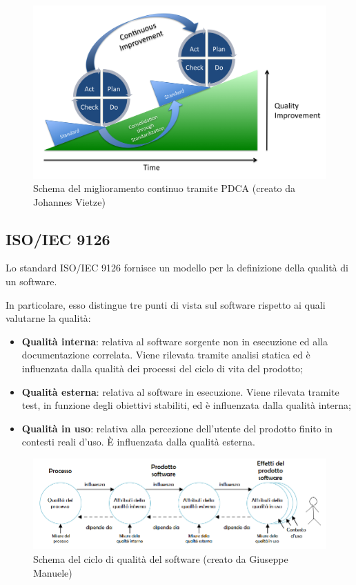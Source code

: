\begin{figure}[httb]
\centering
\includegraphics[scale=0.23]{./img/PDCA_applicazione.png}
\caption[Schema del miglioramento continuo tramite PDCA]{Schema del miglioramento continuo tramite PDCA (creato da Johannes Vietze)}
\end{figure}
\newpage

\subsection{ISO/IEC 9126}
Lo standard ISO/IEC 9126 fornisce un modello per la definizione della qualità di un software.

In particolare, esso distingue tre punti di vista sul software rispetto ai quali valutarne la qualità:
\begin{itemize}
\item \textbf{Qualità interna}: relativa al software sorgente non in esecuzione ed alla documentazione correlata. Viene rilevata tramite analisi statica ed è influenzata dalla qualità dei processi del ciclo di vita del prodotto;
\item \textbf{Qualità esterna}: relativa al software in esecuzione. Viene rilevata tramite test, in funzione degli obiettivi stabiliti, ed è influenzata dalla qualità interna;
\item \textbf{Qualità in uso}: relativa alla percezione dell'utente del prodotto finito in contesti reali d'uso. È influenzata dalla qualità esterna.
\end{itemize}

\begin{figure}[httb]
\centering
\includegraphics[scale=0.6]{./img/ciclo_di_qualita.png}
\caption[Schema del ciclo di qualità  del software]{Schema del ciclo di qualità del software (creato da Giuseppe Manuele)}
\end{figure}

